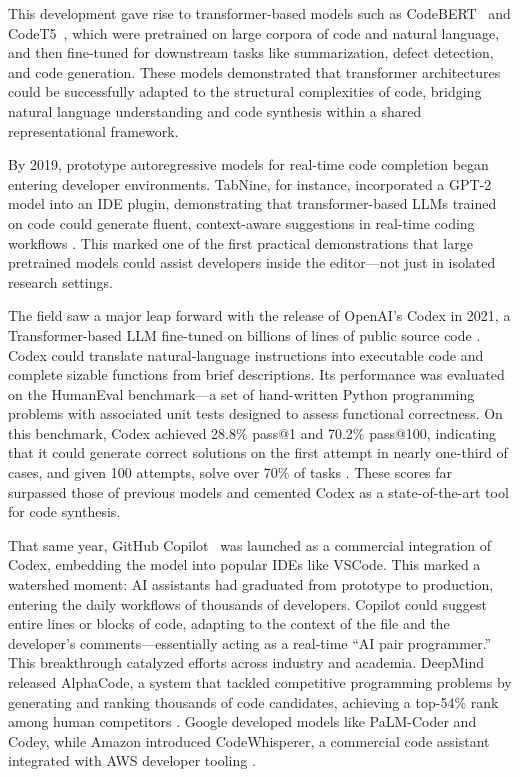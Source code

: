 This development gave rise to transformer-based models such as CodeBERT~\autocite{feng2020codebert} and CodeT5~\autocite{wang2021codet5}, which were pretrained on large corpora of code and natural language, and then fine-tuned for downstream tasks like summarization, defect detection, and code generation. These models demonstrated that transformer architectures could be successfully adapted to the structural complexities of code, bridging natural language understanding and code synthesis within a shared representational framework.

By 2019, prototype autoregressive models for real-time code completion began entering developer environments. TabNine, for instance, incorporated a GPT-2 model into an IDE plugin, demonstrating that transformer-based \glspl{LLM} trained on code could generate fluent, context-aware suggestions in real-time coding workflows \autocite{TabNineBlog2019}. This marked one of the first practical demonstrations that large pretrained models could assist developers inside the editor—not just in isolated research settings.

The field saw a major leap forward with the release of OpenAI’s Codex in 2021, a Transformer-based \gls{LLM} fine-tuned on billions of lines of public source code \autocite{Chen2021}. Codex could translate natural-language instructions into executable code and complete sizable functions from brief descriptions. Its performance was evaluated on the HumanEval benchmark—a set of hand-written Python programming problems with associated unit tests designed to assess functional correctness. On this benchmark, Codex achieved 28.8\% pass@1 and 70.2\% pass@100, indicating that it could generate correct solutions on the first attempt in nearly one-third of cases, and given 100 attempts, solve over 70\% of tasks \autocite{Chen2021,Austin2021}. These scores far surpassed those of previous models and cemented Codex as a state-of-the-art tool for code synthesis.

That same year, GitHub Copilot~\autocite{Github2021CopilotAnnouncement} was launched as a commercial integration of Codex, embedding the model into popular \glspl{IDE} like VSCode. This marked a watershed moment: \gls{AI} assistants had graduated from prototype to production, entering the daily workflows of thousands of developers. Copilot could suggest entire lines or blocks of code, adapting to the context of the file and the developer's comments—essentially acting as a real-time “\gls{AI} pair programmer.” This breakthrough catalyzed efforts across industry and academia. DeepMind released AlphaCode, a system that tackled competitive programming problems by generating and ranking thousands of code candidates, achieving a top-54\% rank among human competitors \autocite{Li2022}. Google developed models like PaLM-Coder and Codey, while Amazon introduced CodeWhisperer, a commercial code assistant integrated with AWS developer tooling \autocite{codewhisperer2023}.

